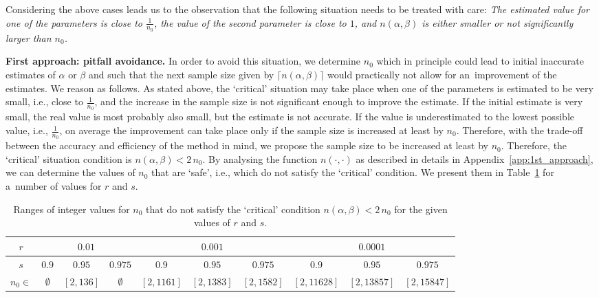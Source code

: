 \documentclass[runningheads,a4paper]{llncs}
\begin{document}
\noindent
Considering the above cases leads us to the observation that the following situation needs to be
treated with care:
  \emph{The estimated value for one of the parameters is close to $\frac{1}{n_0}$, the value of
  the second parameter is close to $1$, and $n(\alpha,\beta)$ is either smaller or not
  significantly larger than $n_0$.}



\medskip
\noindent
{\bf First approach: pitfall avoidance.}
In order to avoid this situation, we determine $n_0$ which in principle could lead to initial
inaccurate estimates of $\alpha$ or $\beta$ and such that the next sample size given by $\lceil
n(\alpha,\beta)\rceil$ would practically not allow for an~improvement of the estimates. We reason
as follows. As stated above, the `critical' situation may take place when one of the parameters is
estimated to be very small, i.e., close to $\frac{1}{n_0}$, and the increase in the sample size is
not significant enough to improve the estimate. If the initial estimate is very small, the real
value is most probably also small, but the estimate is not accurate. If the value is
underestimated to the lowest possible value, i.e., $\frac{1}{n_0}$, on average the improvement can
take place only if the sample size is increased at least by $n_0$. Therefore, with the trade-off
between the accuracy and efficiency of the method in mind, we propose the sample size to be
increased at least by $n_0$. Therefore, the `critical' situation condition is
$n(\alpha,\beta)<2\,n_0$. By analysing the function $n(\cdot,\cdot)$ as described in details in
Appendix~\ref{app:1st_approach}, we can determine the values of $n_0$ that are `safe', i.e.,
which do not satisfy the `critical' condition. We present them in Table~\ref{tab:n_0} for a~number
of values for $r$ and $s$.



\begin{table}[t]
  \centering
  \begin{tabular}{|c|c|c|c|c|c|c|c|c|c|}
  \hline
  $r$ & \multicolumn{3}{c|}{$0.01$} & \multicolumn{3}{c|}{$0.001$} &
   \multicolumn{3}{c|}{$0.0001$}\\
  \hline
  $s$ & $0.9$ & $0.95$ & $0.975$ & $0.9$ & $0.95$ & $0.975$ & $0.9$ & $0.95$ & $0.975$\\
  \hline
  $n_0 \in$ & $\emptyset$ & $[2,136]$ & $\emptyset$ & $[2,1161]$ & $[2,1383]$ & $[2,1582]$ &
   $[2,11628]$ & $[2,13857]$ & $[2,15847]$\\
  \hline
  \end{tabular}
  \caption{Ranges of integer values for $n_0$ that
  do not satisfy the `critical' condition $n(\alpha,\beta)<2\,n_0$
for the given values of $r$ and $s$.}\label{tab:n_0}
\end{table}
\end{document}
